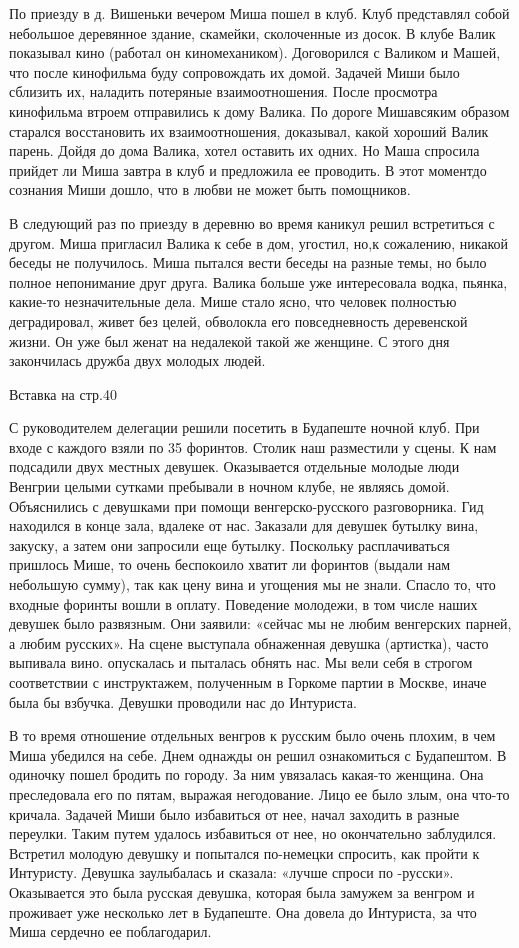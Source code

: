По приезду в д. Вишеньки вечером Миша пошел в клуб. Клуб представлял собой небольшое деревянное здание, скамейки, сколоченные из досок. В клубе Валик показывал кино (работал он киномехаником). Договорился с Валиком и Машей, что после кинофильма буду сопровождать их домой. Задачей Миши было сблизить их, наладить потеряные взаимоотношения. После просмотра кинофильма втроем отправились к дому Валика. По дороге Мишавсяким образом старался восстановить их взаимоотношения, доказывал, какой хороший Валик парень. Дойдя до дома Валика, хотел оставить их одних. Но Маша спросила прийдет ли Миша завтра в клуб и предложила ее проводить. В этот моментдо сознания Миши дошло, что в любви не может быть помощников.

В следующий раз по приезду в деревню во время каникул решил встретиться с другом. Миша пригласил Валика к себе в дом, угостил, но,к сожалению, никакой беседы не получилось. Миша пытался вести беседы на разные темы, но было полное непонимание друг друга. Валика больше уже интересовала водка, пьянка, какие-то незначительные дела. Мише стало ясно, что человек полностью деградировал, живет без целей, обволокла его повседневность деревенской жизни. Он уже был женат на недалекой такой же женщине. С этого дня закончилась дружба двух молодых людей.

Вставка на стр.40

С руководителем делегации решили посетить в Будапеште ночной клуб. При входе с каждого взяли по 35 форинтов. Столик наш разместили у сцены. К нам подсадили двух местных девушек. Оказывается отдельные молодые люди  Венгрии целыми сутками пребывали в ночном клубе, не являясь домой. Объяснились с девушками при помощи венгерско-русского разговорника. Гид находился в конце зала, вдалеке от нас. Заказали для девушек бутылку вина, закуску, а затем они запросили еще бутылку. Поскольку расплачиваться пришлось Мише, то очень беспокоило хватит ли форинтов (выдали нам небольшую сумму), так как цену вина и угощения мы не знали. Спасло то, что входные форинты вошли в оплату. Поведение молодежи, в том числе наших девушек было развязным. Они заявили: «сейчас мы не любим венгерских парней, а любим русских». На сцене выступала обнаженная девушка (артистка), часто выпивала вино. опускалась и пыталась обнять нас. Мы вели себя в строгом соответствии с инструктажем, полученным в Горкоме партии в Москве, иначе была бы взбучка. Девушки проводили нас до Интуриста. 

В то время отношение отдельных венгров к русским было очень плохим, в чем Миша убедился на себе.
Днем однажды он решил ознакомиться с Будапештом. В одиночку пошел бродить по городу. За ним увязалась какая-то женщина. Она преследовала его по пятам, выражая негодование. Лицо ее было злым, она что-то кричала. Задачей Миши было избавиться от нее, начал заходить в разные переулки. Таким путем удалось избавиться от нее, но окончательно заблудился. Встретил молодую девушку и попытался по-немецки спросить, как пройти к Интуристу. Девушка заулыбалась и сказала: «лучше спроси по -русски». Оказывается это была русская девушка, которая была замужем за венгром и проживает уже несколько лет в Будапеште. Она довела до Интуриста, за что Миша сердечно ее поблагодарил. 

